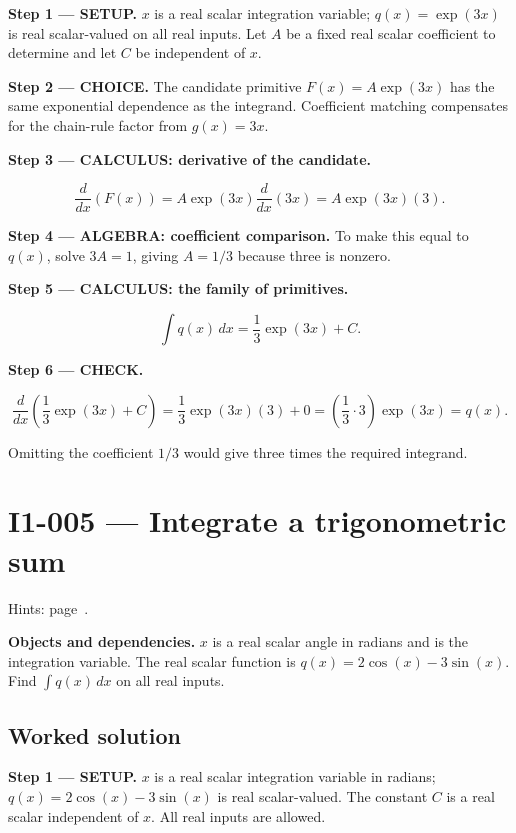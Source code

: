 \documentclass[11pt,oneside,openany]{book}
\begin{document}
\textbf{Step 1 --- SETUP.} \(x\) is a real scalar integration variable;
\(q(x)=\exp(3x)\) is real scalar-valued on all real inputs. Let \(A\) be a fixed
real scalar coefficient to determine and let \(C\) be independent of \(x\).

\begin{ChoiceStep}
\textbf{Step 2 --- CHOICE.} The candidate primitive \(F(x)=A\exp(3x)\) has the same exponential
dependence as the integrand. Coefficient matching compensates for the
chain-rule factor from \(g(x)=3x\).

\end{ChoiceStep}
\textbf{Step 3 --- CALCULUS: derivative of the candidate.}

\[
\frac{d}{dx}\left(F(x)\right)=A\exp(3x)\frac{d}{dx}\left(3x\right)
=A\exp(3x)(3).
\]

\begingroup\color{AlgebraBlue}
\textbf{Step 4 --- ALGEBRA: coefficient comparison.} To make this equal to \(q(x)\),
solve \(3A=1\), giving \(A=1/3\) because three is nonzero.

\endgroup
\textbf{Step 5 --- CALCULUS: the family of primitives.}

\[
\int q(x)\,dx=\frac13\exp(3x)+C.
\]

\textbf{Step 6 --- CHECK.}

\[
\frac{d}{dx}\left(\frac13\exp(3x)+C\right)
=\frac13\exp(3x)(3)+0
=\left(\frac13\cdot3\right)\exp(3x)=q(x).
\]

Omitting the coefficient \(1/3\) would give three times the required integrand.
\clearpage
\section{I1-005 --- Integrate a trigonometric sum}
\label{problem:I1-005}
{\small Hints: page~\pageref{hints:I1-005}.}\par\medskip

\textbf{Objects and dependencies.} \(x\) is a real scalar angle in radians and is the
integration variable. The real scalar function is \(q(x)=2\cos(x)-3\sin(x)\).
Find \(\int q(x)\,dx\) on all real inputs.
\subsection*{Worked solution}

\textbf{Step 1 --- SETUP.} \(x\) is a real scalar integration variable in radians;
\(q(x)=2\cos(x)-3\sin(x)\) is real scalar-valued. The constant \(C\) is a real
scalar independent of \(x\). All real inputs are allowed.
\end{document}
